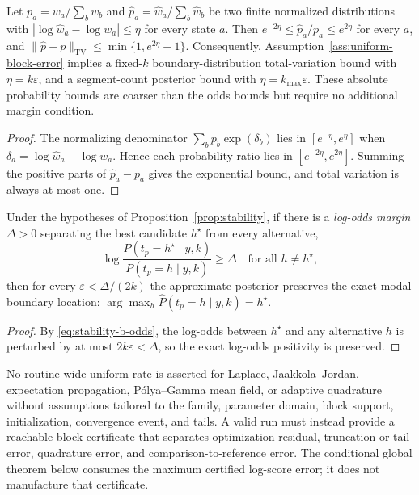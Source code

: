 \begin{corollary}
\label{cor:probability-error-conversion}
Let $p_a=w_a/\sum_b w_b$ and $\widehat p_a=\widehat w_a/\sum_b\widehat w_b$ be two
finite normalized distributions with $|\log\widehat w_a-\log w_a|\le\eta$ for every state $a$. Then
$e^{-2\eta}\le \widehat p_a/p_a\le e^{2\eta}$ for every $a$, and
$\|\widehat p-p\|_{\mathrm{TV}}\le \min\{1,e^{2\eta}-1\}$. Consequently, Assumption~\ref{ass:uniform-block-error}
implies a fixed-$k$ boundary-distribution total-variation bound with $\eta=k\varepsilon$, and a
segment-count posterior bound with $\eta=k_{\max}\varepsilon$. These absolute probability bounds are
coarser than the odds bounds but require no additional margin condition.
\end{corollary}

\begin{proof}
The normalizing denominator $\sum_b p_b\exp(\delta_b)$ lies in $[e^{-\eta},e^{\eta}]$ when
$\delta_a=\log\widehat w_a-\log w_a$. Hence each probability ratio lies in
$[e^{-2\eta},e^{2\eta}]$. Summing the positive parts of $\widehat p_a-p_a$ gives the exponential bound, and total variation is always at most one.
\end{proof}

\begin{corollary}
\label{cor:ranking}
Under the hypotheses of Proposition~\ref{prop:stability}, if there is a \emph{log-odds margin}
$\Delta>0$ separating the best candidate $h^\star$ from every alternative,
\[
\log\frac{P(t_p=h^\star\mid y,k)}{P(t_p=h\mid y,k)}\ge \Delta
\quad\text{for all }h\ne h^\star,
\]
then for every $\varepsilon<\Delta/(2k)$ the approximate posterior preserves the exact modal
boundary location: $\arg\max_h \widehat P(t_p=h\mid y,k)=h^\star$.
\end{corollary}

\begin{proof}
By \eqref{eq:stability-b-odds}, the log-odds between $h^\star$ and any alternative $h$ is
perturbed by at most $2k\varepsilon<\Delta$, so the exact log-odds positivity is preserved.
\end{proof}


\begin{proofobligation}
\label{prop:uniform-bounds}
No routine-wide uniform rate is asserted for Laplace, Jaakkola--Jordan, expectation propagation,
P\'olya--Gamma mean field, or adaptive quadrature without assumptions tailored to the family,
parameter domain, block support, initialization, convergence event, and tails. A valid run must
instead provide a reachable-block certificate that separates optimization residual, truncation or
tail error, quadrature error, and comparison-to-reference error. The conditional global theorem
below consumes the maximum certified log-score error; it does not manufacture that certificate.
\end{proofobligation}




